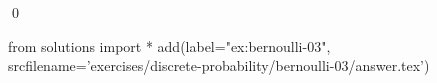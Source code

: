 
\begin{ex} 
  \label{ex:bernoulli-03}
  
  \qed
\end{ex} 
\begin{python0}
from solutions import *
add(label="ex:bernoulli-03",
    srcfilename='exercises/discrete-probability/bernoulli-03/answer.tex') 
\end{python0}
